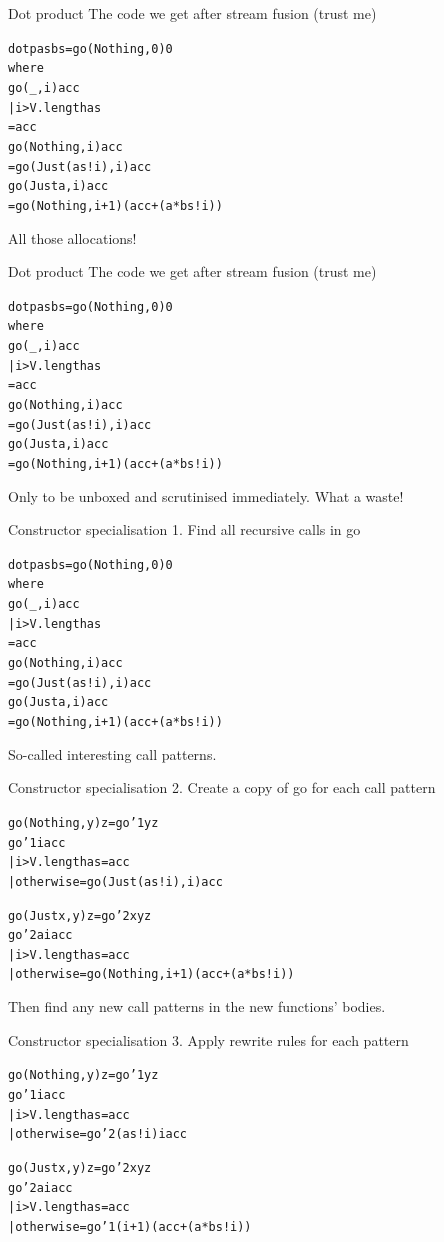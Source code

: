 \documentclass[t]{beamer}
\newcommand{\oomph}[1]{\textcolor[rgb]{0.0,0.5,0.9}{#1}}
\begin{document}
\begin{frame}[fragile]{Dot product}
The code we get after stream fusion (trust me)
\begin{alltt}\Large
dotp as bs = go \oomph{(Nothing,} 0\oomph{)} 0
 where
  go (_, i) acc
   | i > V.length as
   = acc
  go (Nothing, i) acc
   = go (\oomph{Just} (as!i)\oomph{,} i\oomph{)} acc
  go (Just a, i) acc
   = go \oomph{(Nothing,} i + 1\oomph{)} (acc + (a * bs!i))
\end{alltt}
All those allocations!
\end{frame}

\begin{frame}[fragile]{Dot product}
The code we get after stream fusion (trust me)
\begin{alltt}\Large
dotp as bs = go (Nothing, 0) 0
 where
  go \oomph{(}_\oomph{,} i\oomph{)} acc
   | i > V.length as
   = acc
  go \oomph{(Nothing,} i\oomph{)} acc
   = go (Just (as!i), i) acc
  go \oomph{(Just} a\oomph{,} i\oomph{)} acc
   = go (Nothing, i + 1) (acc + (a * bs!i))
\end{alltt}
Only to be unboxed and scrutinised immediately. What a waste!
\end{frame}

\begin{frame}[fragile]{Constructor specialisation}
1. Find all recursive calls in \oomph{go}
\begin{alltt}\Large
dotp as bs = go (Nothing, 0) 0
 where
  go (_, i) acc
   | i > V.length as
   = acc
  go (Nothing, i) acc
   = \oomph{go (Just (as!i), i) acc}
  go (Just a, i) acc
   = \oomph{go (Nothing, i + 1) (acc + (a * bs!i))}
\end{alltt}
So-called interesting call patterns.
\end{frame}

\begin{frame}[fragile]{Constructor specialisation}
2. Create a copy of go for each call pattern
\begin{alltt}
\oomph{go (Nothing, y) z = go'1   y z}
go'1 i acc
 | i > V.length as = acc
 | otherwise       = go (Just (as!i), i) acc

\oomph{go (Just  x, y) z = go'2 x y z}
go'2 a i acc
 | i > V.length as = acc
 | otherwise       = go (Nothing, i + 1) (acc + (a * bs!i))
\end{alltt}
Then find any new call patterns in the new functions' bodies.
\end{frame}

\begin{frame}[fragile]{Constructor specialisation}
3. Apply rewrite rules for each pattern
\begin{alltt}
\oomph{go (Nothing, y) z = go'1   y z}
go'1 i acc
 | i > V.length as = acc
 | otherwise       = \oomph{go'2     (as!i)  i  acc}

\oomph{go (Just  x, y) z = go'2 x y z}
go'2 a i acc
 | i > V.length as = acc
 | otherwise       = \oomph{go'1        (i + 1) (acc + (a * bs!i))}
\end{alltt}
\end{frame}
\end{document}
